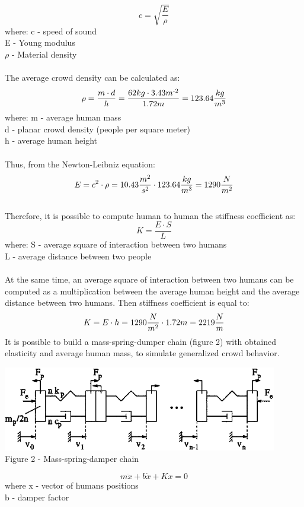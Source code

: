 \documentclass[12pt,a4paper]{report}
\begin{document}
\[ c = \sqrt{\frac{E}{\rho}}\]
where: c - speed of sound\\
E - Young modulus\\
$\rho$ - Material density\\\\
The average crowd density can be calculated as:
\[ \rho=\frac{m \cdot d }{h}=\frac{62kg \cdot 3.43 m \textsuperscript{-2}}{1.72 m}=123.64\frac{kg}{m \textsuperscript{3}}\]
where: m - average human mass\\
d - planar crowd density (people per square meter)\\
h - average human height\\\\
Thus, from the Newton-Leibniz equation:
\[ E = c\textsuperscript{2} \cdot \rho = 10.43\frac{m\textsuperscript{2}}{s\textsuperscript{2}} \cdot 123.64\frac{kg}{m \textsuperscript{3}} = 1290 \frac{N}{m\textsuperscript{2}}\]\\
Therefore, it is possible to compute human to human the stiffness coefficient as:
\[K = \frac{E\cdot S}{L}\]
where: S - average square of interaction between two humans\\
L - average distance between two people\\\\
At the same time, an average square of interaction between two humans can be computed as a multiplication between the average human height and the average distance between two humans. Then stiffness coefficient is equal to:
\[K = E \cdot h = 1290 \frac{N}{m\textsuperscript{2}} \cdot 1.72 m = 2219\frac{N}{m}\]
 It is possible to build a mass-spring-dumper chain (figure 2) with obtained elasticity and average human mass, to simulate generalized crowd behavior.
 \begin{center}
    \includegraphics[width=12cm]{img/Model.png}\\
    Figure 2 - Mass-spring-damper chain
\end{center}
\[m \ddot x + b \dot x + Kx = 0\]
where x - vector of humans positions\\
b - damper factor\\\\
\end{document}
